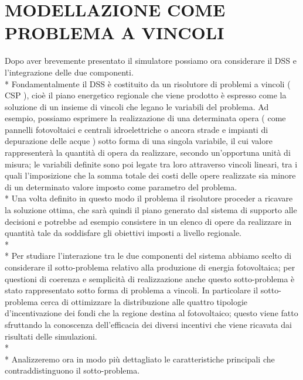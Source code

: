 \documentclass[12pt,a4paper,openright,twoside]{report}
\begin{document}
\section[MODELLAZIONE PROBLEMA]{MODELLAZIONE COME PROBLEMA A VINCOLI}
Dopo aver brevemente presentato il simulatore possiamo ora considerare il DSS e  l'integrazione delle due componenti.\\*
Fondamentalmente il DSS è costituito da un risolutore di problemi a vincoli ( CSP ), cioè il piano energetico regionale che viene prodotto è espresso come la soluzione di un insieme di vincoli che legano le variabili del problema. Ad esempio, possiamo esprimere la realizzazione di una determinata opera ( come pannelli fotovoltaici e centrali idroelettriche o ancora strade e impianti di depurazione delle acque ) sotto forma di una singola variabile, il cui valore rappresenterà la quantità di opera da realizzare, secondo un'opportuna unità di misura; le variabili definite sono poi legate tra loro attraverso vincoli lineari, tra i quali l'imposizione che la somma totale dei costi delle opere realizzate sia minore di un determinato valore imposto come parametro del problema.\\*
Una volta definito in questo modo il problema il risolutore proceder a ricavare la soluzione ottima, che sarà quindi il piano generato dal sistema di supporto alle decisioni e potrebbe ad esempio consistere in un elenco di opere da realizzare in quantità tale da soddisfare gli obiettivi imposti a livello regionale.
\\* \\*
Per studiare l'interazione tra le due componenti del sistema abbiamo scelto di considerare il sotto-problema relativo alla produzione di energia fotovoltaica; per questioni di coerenza e semplicità di realizzazione anche questo sotto-problema è stato rappresentato sotto forma di problema a vincoli. In particolare il sotto-problema cerca di ottimizzare la distribuzione alle quattro tipologie d'incentivazione dei fondi che la regione destina al fotovoltaico; questo viene fatto sfruttando la conoscenza dell'efficacia dei diversi incentivi che viene ricavata dai risultati delle simulazioni.
\\* \\*
Analizzeremo ora in modo più dettagliato le caratteristiche principali che contraddistinguono il sotto-problema.
\end{document}
